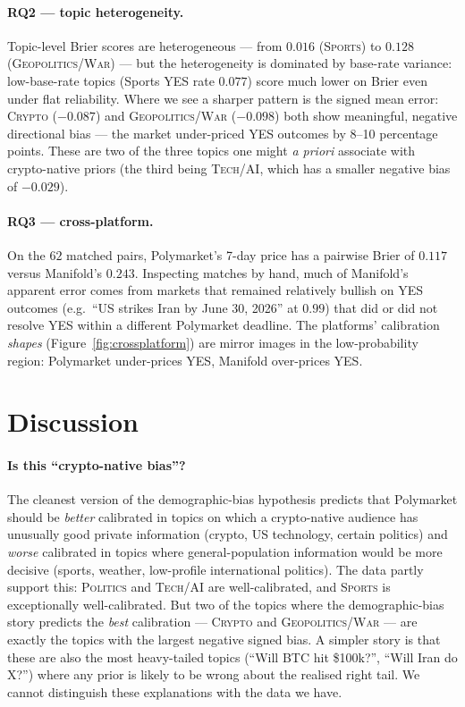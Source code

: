 \documentclass{article}
\begin{document}
\paragraph{RQ2 --- topic heterogeneity.}
Topic-level Brier scores are heterogeneous --- from $0.016$
(\textsc{Sports}) to $0.128$ (\textsc{Geopolitics/War}) --- but the
heterogeneity is dominated by base-rate variance: low-base-rate
topics (Sports YES rate $0.077$) score much lower on Brier even
under flat reliability. Where we see a sharper pattern is the signed
mean error: \textsc{Crypto} ($-0.087$) and \textsc{Geopolitics/War}
($-0.098$) both show meaningful, negative directional bias --- the
market under-priced YES outcomes by 8--10 percentage points. These are
two of the three topics one might \emph{a priori} associate with
crypto-native priors (the third being \textsc{Tech/AI}, which has a
smaller negative bias of $-0.029$).

\paragraph{RQ3 --- cross-platform.}
On the $62$ matched pairs, Polymarket's 7-day price has a pairwise
Brier of $0.117$ versus Manifold's $0.243$. Inspecting matches by
hand, much of Manifold's apparent error comes from markets that
remained relatively bullish on YES outcomes (e.g.\ ``US strikes
Iran by June 30, 2026'' at $0.99$) that did or did not resolve YES
within a different Polymarket deadline. The platforms' calibration
\emph{shapes} (Figure~\ref{fig:crossplatform}) are mirror images in
the low-probability region: Polymarket under-prices YES,
Manifold over-prices YES.

\section{Discussion}

\paragraph{Is this ``crypto-native bias''?}
The cleanest version of the demographic-bias hypothesis predicts that
Polymarket should be \emph{better} calibrated in topics on which a
crypto-native audience has unusually good private information (crypto,
US technology, certain politics) and \emph{worse} calibrated in topics
where general-population information would be more decisive (sports,
weather, low-profile international politics). The data partly
support this: \textsc{Politics} and \textsc{Tech/AI} are
well-calibrated, and \textsc{Sports} is exceptionally well-calibrated.
But two of the topics where the demographic-bias story predicts the
\emph{best} calibration --- \textsc{Crypto} and \textsc{Geopolitics/War}
--- are exactly the topics with the largest negative signed bias.
A simpler story is that these are also the most heavy-tailed topics
(``Will BTC hit \$100k?'', ``Will Iran do X?'') where any prior is
likely to be wrong about the realised right tail. We cannot
distinguish these explanations with the data we have.
\end{document}
